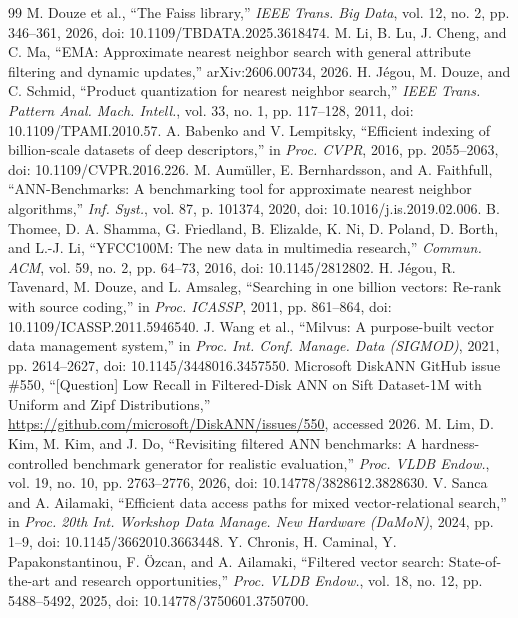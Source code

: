 \documentclass[conference]{IEEEtran}
\begin{document}
\begin{thebibliography}{99}
 M. Douze et al., ``The Faiss library,'' \emph{IEEE Trans. Big Data}, vol. 12, no. 2, pp. 346--361, 2026, doi: 10.1109/TBDATA.2025.3618474.
 M. Li, B. Lu, J. Cheng, and C. Ma, ``EMA: Approximate nearest neighbor search with general attribute filtering and dynamic updates,'' arXiv:2606.00734, 2026.
 H. J\'egou, M. Douze, and C. Schmid, ``Product quantization for nearest neighbor search,'' \emph{IEEE Trans. Pattern Anal. Mach. Intell.}, vol. 33, no. 1, pp. 117--128, 2011, doi: 10.1109/TPAMI.2010.57.
 A. Babenko and V. Lempitsky, ``Efficient indexing of billion-scale datasets of deep descriptors,'' in \emph{Proc. CVPR}, 2016, pp. 2055--2063, doi: 10.1109/CVPR.2016.226.
 M. Aum\"uller, E. Bernhardsson, and A. Faithfull, ``ANN-Benchmarks: A benchmarking tool for approximate nearest neighbor algorithms,'' \emph{Inf. Syst.}, vol. 87, p. 101374, 2020, doi: 10.1016/j.is.2019.02.006.
 B. Thomee, D. A. Shamma, G. Friedland, B. Elizalde, K. Ni, D. Poland, D. Borth, and L.-J. Li, ``YFCC100M: The new data in multimedia research,'' \emph{Commun. ACM}, vol. 59, no. 2, pp. 64--73, 2016, doi: 10.1145/2812802.
 H. J\'egou, R. Tavenard, M. Douze, and L. Amsaleg, ``Searching in one billion vectors: Re-rank with source coding,'' in \emph{Proc. ICASSP}, 2011, pp. 861--864, doi: 10.1109/ICASSP.2011.5946540.
 J. Wang et al., ``Milvus: A purpose-built vector data management system,'' in \emph{Proc. Int. Conf. Manage. Data (SIGMOD)}, 2021, pp. 2614--2627, doi: 10.1145/3448016.3457550.
 Microsoft DiskANN GitHub issue \#550, ``[Question] Low Recall in Filtered-Disk ANN on Sift Dataset-1M with Uniform and Zipf Distributions,'' \url{https://github.com/microsoft/DiskANN/issues/550}, accessed 2026.
 M. Lim, D. Kim, M. Kim, and J. Do, ``Revisiting filtered ANN benchmarks: A hardness-controlled benchmark generator for realistic evaluation,'' \emph{Proc. VLDB Endow.}, vol. 19, no. 10, pp. 2763--2776, 2026, doi: 10.14778/3828612.3828630.
 V. Sanca and A. Ailamaki, ``Efficient data access paths for mixed vector-relational search,'' in \emph{Proc. 20th Int. Workshop Data Manage. New Hardware (DaMoN)}, 2024, pp. 1--9, doi: 10.1145/3662010.3663448.
 Y. Chronis, H. Caminal, Y. Papakonstantinou, F. \"Ozcan, and A. Ailamaki, ``Filtered vector search: State-of-the-art and research opportunities,'' \emph{Proc. VLDB Endow.}, vol. 18, no. 12, pp. 5488--5492, 2025, doi: 10.14778/3750601.3750700.

\end{thebibliography}
\end{document}

